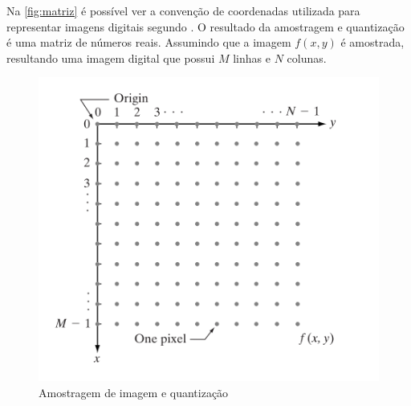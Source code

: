 Na \autoref{fig:matriz} é possível ver a convenção de coordenadas utilizada para representar imagens digitais segundo . O resultado da amostragem e quantização é uma matriz de números reais. Assumindo que a imagem $f(x,y)$ é amostrada, resultando uma imagem digital que possui $M$ linhas e $N$ colunas.


\begin{figure}[h]
	\caption{\label{fig:matriz}Amostragem de imagem e quantização}
	\begin{center}
	    \includegraphics[width=.6\textwidth]{resources/matriz}
	\end{center}
\end{figure}






